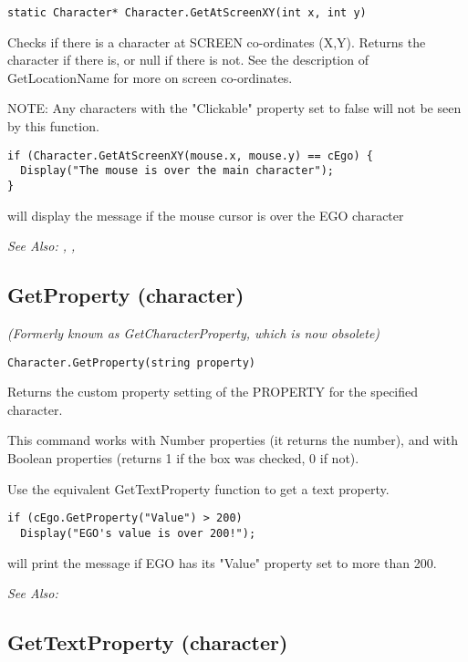 \begin{verbatim}
static Character* Character.GetAtScreenXY(int x, int y)
\end{verbatim}
Checks if there is a character at SCREEN co-ordinates (X,Y).
Returns the character if there is, or null if there is not.
See the description of GetLocationName for more on screen co-ordinates.

NOTE: Any characters with the "Clickable" property set to false will not be seen
by this function.

\begin{verbatim}
if (Character.GetAtScreenXY(mouse.x, mouse.y) == cEgo) {
  Display("The mouse is over the main character");
}
\end{verbatim}
will display the message if the mouse cursor is over the EGO character

\it{See Also:} ,
,


\subsection{GetProperty (character)}\label{Character.GetProperty}%

\it{(Formerly known as GetCharacterProperty, which is now obsolete)}

\begin{verbatim}
Character.GetProperty(string property)
\end{verbatim}
Returns the custom property setting of the PROPERTY for the specified character.

This command works with Number properties (it returns the number), and with Boolean
properties (returns 1 if the box was checked, 0 if not).

Use the equivalent GetTextProperty function to get a text property.

\begin{verbatim}
if (cEgo.GetProperty("Value") > 200)
  Display("EGO's value is over 200!");
\end{verbatim}
will print the message if EGO has its "Value" property set to more than 200.

\it{See Also:} 


\subsection{GetTextProperty (character)}\label{Character.GetTextProperty}%

